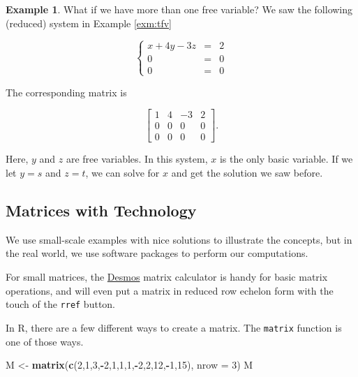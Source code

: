 \documentclass[
]{book}
\newenvironment{Shaded}{\begin{snugshade}}{\end{snugshade}}
\newcommand{\AttributeTok}[1]{\textcolor[rgb]{0.13,0.29,0.53}{#1}}
\newcommand{\DecValTok}[1]{\textcolor[rgb]{0.00,0.00,0.81}{#1}}
\newcommand{\FunctionTok}[1]{\textcolor[rgb]{0.13,0.29,0.53}{\textbf{#1}}}
\newcommand{\NormalTok}[1]{#1}
\newcommand{\OtherTok}[1]{\textcolor[rgb]{0.56,0.35,0.01}{#1}}
\newcommand{\SpecialCharTok}[1]{\textcolor[rgb]{0.81,0.36,0.00}{\textbf{#1}}}
\theoremstyle{definition}
\theoremstyle{definition}
\newtheorem{example}{Example}[chapter]
\theoremstyle{definition}
\theoremstyle{definition}
\theoremstyle{remark}
\begin{document}
\begin{examplebox}

\begin{example}
What if we have more than one free variable? We saw the following (reduced) system in Example \ref{exm:tfv}

\begin{equation*}
    \left\{
    \begin{array}{rcl}
    x+4y-3z&=&2\\
    0&=&0\\
    0&=&0
    \end{array} \right. 
\end{equation*}

The corresponding matrix is

\[\left[\begin{array}{rrr|r}
1 & 4 & -3 & 2\\
0 & 0 & 0 & 0\\
0 & 0 & 0 & 0
\end{array}\right].\]

Here, \(y\) and \(z\) are free variables. In this system, \(x\) is the only basic variable. If we let \(y=s\) and \(z=t\), we can solve for \(x\) and get the solution we saw before.
\end{example}

\end{examplebox}

\subsection*{Matrices with Technology}\label{TM}

We use small-scale examples with nice solutions to illustrate the concepts, but in the real world, we use software packages to perform our computations.

For small matrices, the \href{https://www.desmos.com/matrix}{Desmos}\autocite{Desmos} matrix calculator is handy for basic matrix operations, and will even put a matrix in reduced row echelon form with the touch of the \texttt{rref} button.

In R, there are a few different ways to create a matrix. The \texttt{matrix} function is one of those ways.

\begin{Shaded}
\begin{Highlighting}[]
\NormalTok{M }\OtherTok{\textless{}{-}} \FunctionTok{matrix}\NormalTok{(}\FunctionTok{c}\NormalTok{(}\DecValTok{2}\NormalTok{,}\DecValTok{1}\NormalTok{,}\DecValTok{3}\NormalTok{,}\SpecialCharTok{{-}}\DecValTok{2}\NormalTok{,}\DecValTok{1}\NormalTok{,}\DecValTok{1}\NormalTok{,}\DecValTok{1}\NormalTok{,}\SpecialCharTok{{-}}\DecValTok{2}\NormalTok{,}\DecValTok{2}\NormalTok{,}\DecValTok{12}\NormalTok{,}\SpecialCharTok{{-}}\DecValTok{1}\NormalTok{,}\DecValTok{15}\NormalTok{), }\AttributeTok{nrow =} \DecValTok{3}\NormalTok{)}
\NormalTok{M}
\end{Highlighting}
\end{Shaded}
\end{document}
